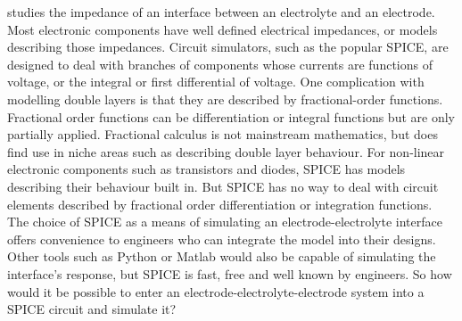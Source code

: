    studies the impedance of an interface between an electrolyte and an electrode.
  Most electronic components have well defined electrical impedances, or models describing those impedances.
  Circuit simulators, such as the popular SPICE, are designed to deal with branches of components whose currents are functions of voltage, or the integral or first differential of voltage.
  One complication with modelling double layers is that they are described by fractional-order functions.
  Fractional order functions can be differentiation or integral functions but are only partially applied.
  Fractional calculus is not mainstream mathematics, but does find use in niche areas such as describing double layer behaviour.
  For non-linear electronic components such as transistors and diodes, SPICE has models describing their behaviour built in.
  But SPICE has no way to deal with circuit elements described by fractional order differentiation or integration functions.
  The choice of SPICE as a means of simulating an electrode-electrolyte interface offers convenience to engineers who can integrate the model into their designs.
  Other tools such as Python or Matlab would also be capable of simulating the interface's response, but SPICE is fast, free and well known by engineers.
  So how would it be possible to enter an electrode-electrolyte-electrode system into a SPICE circuit and simulate it?
